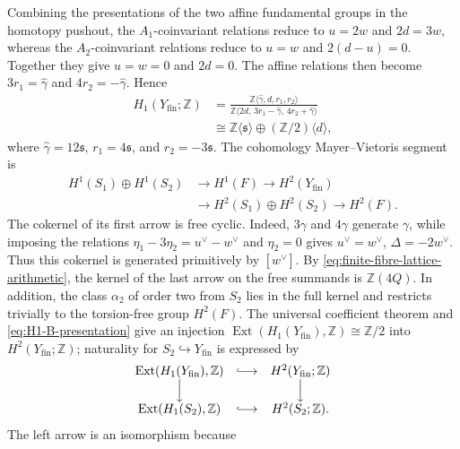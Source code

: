Combining the presentations of the two affine fundamental groups in the
homotopy pushout, the $A_1$-coinvariant relations reduce to
$u=2w$ and $2d=3w$, whereas the $A_2$-coinvariant relations reduce to
$u=w$ and $2(d-u)=0$.  Together they give $u=w=0$ and $2d=0$.
The affine relations then become
$3r_1=\widehat\gamma$ and $4r_2=-\widehat\gamma$.  Hence
\begin{equation}\label{eq:H1-B-presentation}
 \begin{split}
 H_1(Y_{\mathrm{fin}};\mathbb Z)
 &=\frac{\mathbb Z\langle\widehat\gamma,d,r_1,r_2\rangle}
 {\mathbb Z\langle2d,\,3r_1-\widehat\gamma,\,
 4r_2+\widehat\gamma\rangle}\\
 &\cong\mathbb Z\langle\mathfrak s\rangle
   \oplus(\mathbb Z/2)\langle d\rangle,
 \end{split}
\end{equation}
where $\widehat\gamma=12\mathfrak s$, $r_1=4\mathfrak s$, and
$r_2=-3\mathfrak s$.  The cohomology
Mayer--Vietoris segment is
\[
 \begin{split}
 H^1(S_1)\oplus H^1(S_2)&\longrightarrow H^1(F)
 \longrightarrow H^2(Y_{\mathrm{fin}})\\
 &\longrightarrow H^2(S_1)\oplus H^2(S_2)
 \longrightarrow H^2(F).
 \end{split}
\]
The cokernel of its first arrow is free cyclic.  Indeed,
$3\gamma$ and $4\gamma$ generate $\gamma$, while
imposing the relations $\eta_1-3\eta_2=u^\vee-w^\vee$ and $\eta_2=0$ gives
$u^\vee=w^\vee$, $\Delta=-2w^\vee$.  Thus this cokernel is generated primitively by
$[w^\vee]$.  By \eqref{eq:finite-fibre-lattice-arithmetic}, the kernel of
the last arrow on the free summands is $\mathbb Z(4Q)$.  In addition, the
class $\alpha_2$ of order two from $S_2$ lies in the full kernel and
restricts trivially
to the torsion-free group $H^2(F)$.  The universal coefficient theorem and
\eqref{eq:H1-B-presentation} give an injection
$\operatorname{Ext}(H_1(Y_{\mathrm{fin}}),\mathbb Z)\cong\mathbb Z/2$
into $H^2(Y_{\mathrm{fin}};\mathbb Z)$; naturality for
$S_2\hookrightarrow Y_{\mathrm{fin}}$ is expressed by
\[
 \begin{array}{ccc}
 \operatorname{Ext}(H_1(Y_{\mathrm{fin}}),\mathbb Z)
   &\lhook\joinrel\longrightarrow&H^2(Y_{\mathrm{fin}};\mathbb Z)\\
 \Big\downarrow&&\Big\downarrow\\
 \operatorname{Ext}(H_1(S_2),\mathbb Z)
   &\lhook\joinrel\longrightarrow&H^2(S_2;\mathbb Z).
 \end{array}
\]
The left arrow is an isomorphism because

